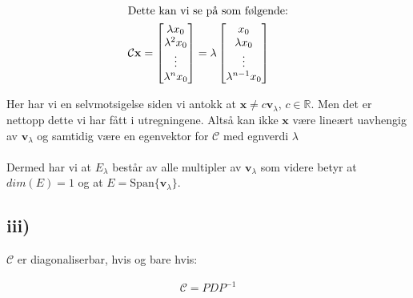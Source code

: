 \documentclass[a4paper, norsk, twoside, 10pt]{article}
\begin{document}
\begin{flushleft}
\begin{align*}
    \intertext{Dette kan vi se på som følgende:}
    \mathcal{C}\mathbf{x} &=
    \begin{bmatrix}
      \lambda x_{0} \\
      \lambda^2 x_{0} \\
      \vdots \\
      \lambda^{n} x_{0} \\
    \end{bmatrix} =
    \lambda \begin{bmatrix}
      x_{0} \\
      \lambda x_{0} \\
      \vdots \\
      \lambda^{n-1} x_{0} \\
    \end{bmatrix}
  \end{align*}

  Her har vi en selvmotsigelse siden vi antokk at $\mathbf{x}  \neq c\mathbf{v}_{\lambda}, \, c \in \mathbb{R}$. Men det er nettopp dette vi har fått i utregningene. Altså kan ikke $\mathbf{x}$ være lineært uavhengig av $\mathbf{v}_{\lambda}$ og samtidig være en egenvektor for $\mathcal{C}$ med egnverdi $\lambda$  \\ \ \\

  Dermed har vi at $E_{\lambda}$ består av alle multipler av $\mathbf{v}_{\lambda}$ som videre betyr at $dim(E) = 1$ og at $E = \text{Span}\{\mathbf{v}_{\lambda}\}$.


  \subsection*{iii)}

  $\mathcal{C}$ er diagonaliserbar, hvis og bare hvis:

  \begin{align*}
    \mathcal{C} = PDP^{-1}
  \end{align*}


\end{flushleft}
\end{document}
